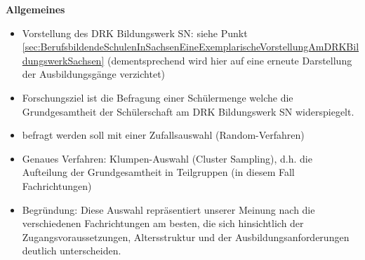\textbf{Allgemeines}
\begin{itemize}
	\item Vorstellung des DRK Bildungswerk SN: siehe Punkt \ref{sec:BerufsbildendeSchulenInSachsenEineExemplarischeVorstellungAmDRKBildungswerkSachsen} (dementsprechend wird hier auf eine erneute Darstellung der Ausbildungsgänge verzichtet)
	\item Forschungsziel ist die Befragung einer Schülermenge welche die Grundgesamtheit der Schülerschaft am DRK Bildungswerk SN widerspiegelt.
	\item befragt werden soll mit einer Zufallsauswahl (Random-Verfahren)
	\item Genaues Verfahren: Klumpen-Auswahl (Cluster Sampling), d.h. die Aufteilung der Grundgesamtheit in Teilgruppen (in diesem Fall Fachrichtungen) 
	\item Begründung: Diese Auswahl repräsentiert unserer Meinung nach die verschiedenen Fachrichtungen am besten, die sich hinsichtlich der Zugangsvoraussetzungen, Altersstruktur und der Ausbildungsanforderungen deutlich unterscheiden.
\end{itemize}

